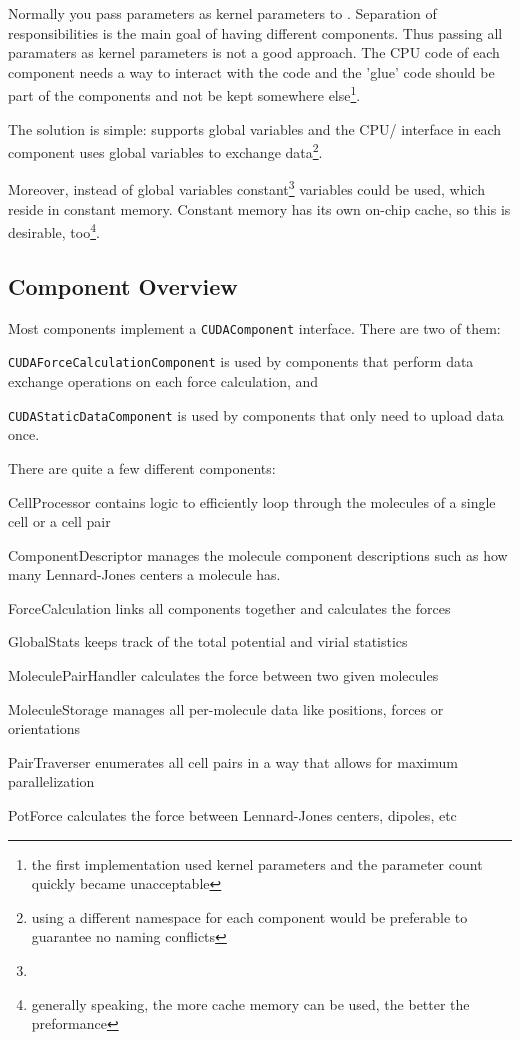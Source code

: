 Normally you pass parameters as kernel parameters to \cuda{}. Separation of responsibilities is the main goal of having different components. Thus passing all paramaters as kernel parameters is not a good approach. The CPU code of each component needs a way to interact with the \cuda{} code and the 'glue' code should be part of the components and not be kept somewhere else\footnote{the first implementation used kernel parameters and the parameter count quickly became unacceptable}.

The solution is simple: \cuda{} supports global variables and the CPU/\cuda{} interface in each component uses global variables to exchange data\footnote{using a different namespace for each component would be preferable to guarantee no naming conflicts}.

Moreover, instead of global variables constant\footnote{} variables could be used, which reside in constant memory. Constant memory has its own on-chip cache, so this is desirable, too\footnote{generally speaking, the more cache memory can be used, the better the preformance}.


\subsection{Component Overview}
Most components implement a \lstinline!CUDAComponent! interface. There are two of them:
\begin{compactitem}
\item \lstinline!CUDAForceCalculationComponent! is used by components that perform data exchange operations on each force calculation, and
\item \lstinline!CUDAStaticDataComponent! is used by components that only need to upload data once.
\end{compactitem}

There are quite a few different components:
\begin{compactdesc}
\item[CellProcessor] contains logic to efficiently loop through the molecules of a single cell or a cell pair
\item[ComponentDescriptor] manages the molecule component descriptions such as how many Lennard-Jones centers a molecule has.
\item[ForceCalculation] links all components together and calculates the forces
\item[GlobalStats] keeps track of the total potential and virial statistics
\item[MoleculePairHandler] calculates the force between two given molecules
\item[MoleculeStorage] manages all per-molecule data like positions, forces or orientations
\item[PairTraverser] enumerates all cell pairs in a way that allows for maximum parallelization
\item[PotForce] calculates the force between Lennard-Jones centers, dipoles, etc
\end{compactdesc}


